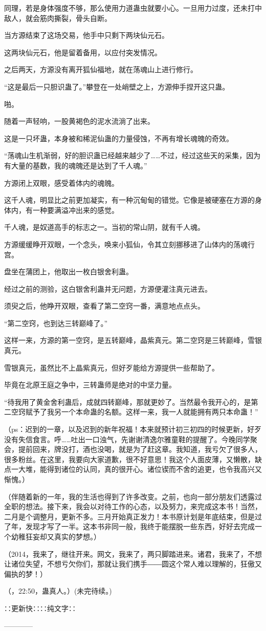 \begin{this_body}
同理，若是身体强度不够，那么使用力道蛊虫就要小心。一旦用力过度，还未打中敌人，就会筋肉撕裂，骨头自断。

当方源结束了这场交易，他手中只剩下两块仙元石。

这两块仙元石，他是留着备用，以应付突发情况。

之后两天，方源没有离开狐仙福地，就在荡魂山上进行修行。

“这是最后一只胆识蛊了。”攀登在一处峭壁之上，方源伸手捏开这只蛊。

啪。

随着一声轻响，一股黄褐色的泥水流淌了出来。

这是一只坏蛊，本身被和稀泥仙蛊的力量侵蚀，不再有增长魂魄的奇效。

“荡魂山生机渐弱，好的胆识蛊已经越来越少了……不过，经过这些天的采集，因为有大量的基数，我的魂魄还是达到了千人魂。”

方源闭上双眼，感受着体内的魂魄。

这千人魂，明显比之前更加凝实，有一种沉甸甸的错觉。它像是被硬塞在方源的身体内，有一种要满溢冲出来的感觉。

千人魂，是奴道高手的标志之一。当初的常山阴，就有千人魂。

方源缓缓睁开双眼，一个念头，唤来小狐仙，令其立刻挪移进了山体内的荡魂行宫。

盘坐在蒲团上，他取出一枚白银舍利蛊。

经过之前的测验，这白银舍利蛊并无问题，方源便灌注真元进去。

须臾之后，他睁开双眼，查看了第二空窍一番，满意地点点头。

“第二空窍，也到达三转巅峰了。”

这样一来，方源的第一空窍，是五转巅峰，晶紫真元。第二空窍是三转巅峰，雪银真元。

雪银真元，虽然比不上晶紫真元，但好歹能给方源提供一些帮助了。

毕竟在北原王庭之争中，三转蛊师是绝对的中坚力量。

“待我用了黄金舍利蛊后，成就四转巅峰，那就更妙了。当然最令我开心的，是第二空窍赋予了我另一个本命蛊的名额。这样一来，我一人就能拥有两只本命蛊！”

（ps：迟到的一章，以及迟到的新年祝福！本来就预计初三初四的时候更新，好歹没有失信食言。呼……吐出一口浊气，先谢谢清逸尔雅童鞋的提醒了。今晚同学聚会，提前回来，牌没打，酒也没喝，就是为了赶这章。我知道，我亏欠了很多人，很多粉丝。在这里，我要向大家道歉，很不好意思！我这个人面皮薄，又懒散，缺点一大堆，能得到诸位的认同，真的很开心。诸位锲而不舍的追更，也令我高兴又惭愧。）

（伴随着新的一年，我的生活也得到了许多改变。之前，也向一部分朋友们透露过全职的想法。接下来，我会以对待工作的心态，以及努力，来完成这本书！当然，二月是个调整月，更新不多。三月开始真正发力！本书原计划是年底结束，但是过了年，发现才写了一半。这本书非同一般，我终于能摆脱一些东西，好好去完成一个幼稚狂妄却又真实的梦想。）

（2014，我来了，继往开来。网文，我来了，两只脚踏进来。诸君，我来了，不想让诸位失望，不想亏欠你们，那就让我们携手――圆这个常人难以理解的，狂傲又偏执的梦！）

（，22:50，蛊真人。）(未完待续。)

∷更新快∷∷纯文字∷

------------

\end{this_body}


